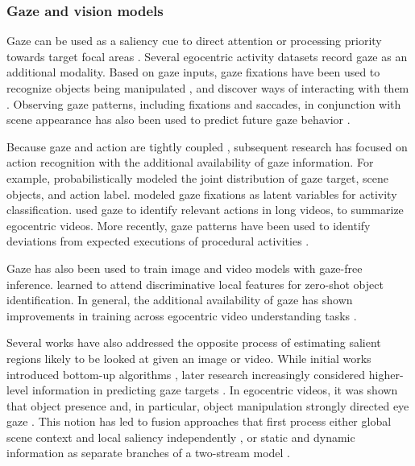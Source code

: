 \subsubsection{Gaze and vision models} 
\label{sec:recognition::audio:::gazemodels}

Gaze can be used as a saliency cue to direct attention or processing priority towards target focal areas . Several egocentric activity datasets  record gaze as an additional modality. Based on gaze inputs, gaze fixations have been used to recognize objects being manipulated , and discover ways of interacting with them . Observing gaze patterns, including fixations and saccades, in conjunction with scene appearance has also been used to predict future gaze behavior .

Because gaze and action are tightly coupled , subsequent research has focused on action recognition with the additional availability of gaze information. For example,  probabilistically modeled the joint distribution of gaze target, scene objects, and action label.  modeled gaze fixations as latent variables for activity classification.  used gaze to identify relevant actions in long videos, to summarize egocentric videos. More recently, gaze patterns have been used to identify deviations from expected executions of procedural activities .

Gaze has also been used to train image and video models with gaze-free inference.  learned to attend discriminative local features for zero-shot object identification. In general, the additional availability of gaze has shown improvements in training across egocentric video understanding tasks . 

Several works have also addressed the opposite process of estimating salient regions likely to be looked at given an image or video. While initial works introduced bottom-up algorithms , later research increasingly considered higher-level information in predicting gaze targets . In egocentric videos, it was shown that object presence and, in particular, object manipulation strongly directed eye gaze . This notion has led to fusion approaches that first process either global scene context and local saliency independently , or static and dynamic information as separate branches of a two-stream model .

